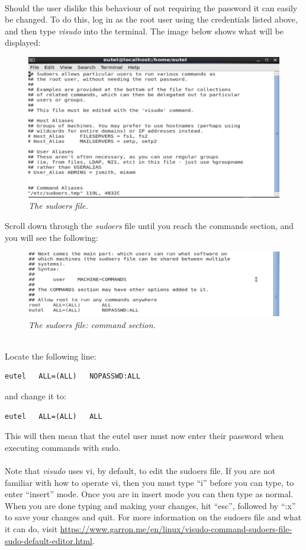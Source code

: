 \documentclass[11pt]{article}
\begin{document}
\paragraph{}
Should the user dislike this behaviour of not requiring the password it can easily be changed. To do this, log in as the root user using the credentials listed above, and then type \textit{visudo} into the terminal. The image below shows what will be displayed:
\begin{figure}[!ht]
	\centering
	\includegraphics[scale=0.3]{visudo1.png}
	\caption{\textit{The sudoers file.}}
\end{figure}
Scroll down through the \textit{sudoers} file until you reach the commands section, and you will see the following:
\begin{figure}[!ht]
	\centering
	\includegraphics[scale=0.3]{visudo2.png}
	\caption{\textit{The sudoers file: command section.}}
\end{figure}
\\Locate the following line:
\begin{verbatim}
eutel	ALL=(ALL)	NOPASSWD:ALL
\end{verbatim}
and change it to:
\begin{verbatim}
eutel	ALL=(ALL)	ALL
\end{verbatim}
This will then mean that the eutel user must now enter their password when executing commands with sudo.
\paragraph{}
Note that \textit{visudo} uses vi, by default, to edit the sudoers file. If you are not familiar with how to operate vi, then you must type ``i'' before you can type, to enter ``insert'' mode. Once you are in insert mode you can then type as normal. When you are done typing and making your changes, hit ``esc'', followed by ``:x'' to save your changes and quit. For more information on the sudoers file and what it can do, visit \url{https://www.garron.me/en/linux/visudo-command-sudoers-file-sudo-default-editor.html}.
\end{document}
